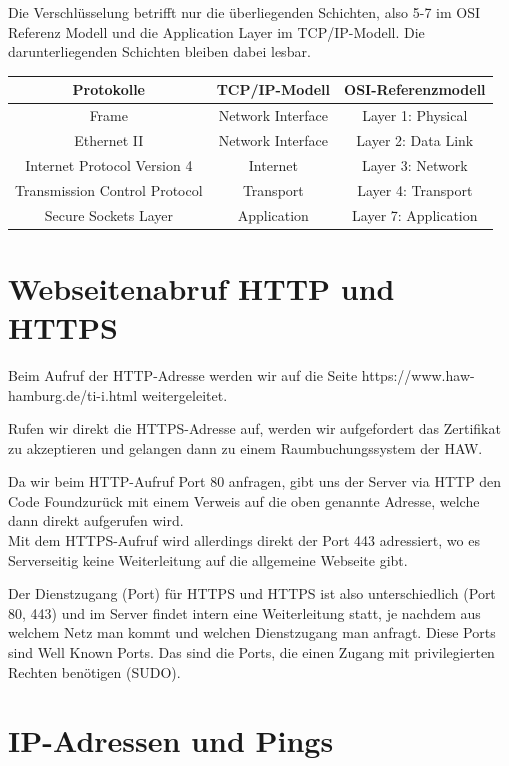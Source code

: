 \documentclass[paper=a4, fontsize=11pt]{scrreprt}
\numberwithin{equation}{section}
\numberwithin{figure}{section}
\numberwithin{table}{section}
\begin{document}
Die Verschlüsselung betrifft nur die überliegenden Schichten, also 5-7 im OSI Referenz Modell und die Application Layer im TCP/IP-Modell. Die darunterliegenden Schichten bleiben dabei lesbar.
\begin{center}
\begin{tabular}{|c|c|c|}
 \hline
 \textbf{Protokolle} & \textbf{TCP/IP-Modell} & \textbf{OSI-Referenzmodell} \\
 \hline
 Frame & Network Interface & Layer 1: Physical \\
 \hline
 Ethernet II & Network Interface & Layer 2: Data Link \\
 \hline
 Internet Protocol Version 4 & Internet & Layer 3: Network \\
 \hline
 Transmission Control Protocol & Transport & Layer 4: Transport\\
 \hline
 Secure Sockets Layer & Application &  Layer 7: Application\\
 \hline
\end{tabular}
\end{center}

\section{Webseitenabruf HTTP und HTTPS}

Beim Aufruf der HTTP-Adresse werden wir auf die Seite https://www.haw-hamburg.de/ti-i.html weitergeleitet.

Rufen wir direkt die HTTPS-Adresse auf, werden wir aufgefordert das Zertifikat zu akzeptieren und gelangen dann zu einem Raumbuchungssystem der HAW.

Da wir beim HTTP-Aufruf Port 80 anfragen, gibt uns der Server via HTTP den Code  Found\grqq zurück mit einem Verweis auf die oben genannte Adresse, welche dann direkt aufgerufen wird.\\

Mit dem HTTPS-Aufruf wird allerdings direkt der Port 443 adressiert, wo es Serverseitig keine Weiterleitung auf die allgemeine Webseite gibt.

Der Dienstzugang (Port) für HTTPS und HTTPS ist also unterschiedlich (Port 80, 443) und im Server findet intern eine Weiterleitung statt, je nachdem aus welchem Netz man kommt und welchen Dienstzugang man anfragt. Diese Ports sind Well Known Ports. Das sind die Ports, die einen Zugang mit privilegierten Rechten benötigen (SUDO).

\section{IP-Adressen und Pings}
\end{document}
